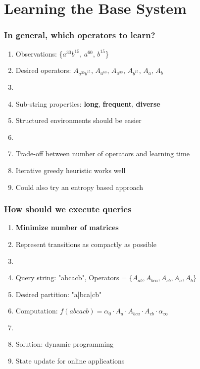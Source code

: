 \documentclass{beamer}
\begin{document}

\section{Learning the Base System}

\begin{frame}
\frametitle{In general, which operators to learn?}
\begin{enumerate}

\item Observations: \{$a^{30}b^{15}$, $a^{60}$, $b^{15}$\}

\item[] Desired operators: $A_{a^{30}b^{15}}$, $A_{a^{60}}$, $A_{a^{30}}$, $A_{b^{15}}$, $A_a$, $A_b$
\item[]

\item Sub-string properties: 
\textbf{long}, \textbf{frequent}, \textbf{diverse}
\item[] Structured environments should be easier
\item[]

\item Trade-off between number of operators and learning time
\item[] Iterative greedy heuristic works well
\item[] Could also try an entropy based approach

\end{enumerate}
\end{frame}


\begin{frame}
\frametitle{How should we execute queries}
\begin{enumerate}

\item \textbf{Minimize number of matrices}
\item[] Represent transitions as compactly as possible 
\item[]

\item Query string: "abcacb", Operators = $\{A_{ab}, A_{bca}, A_{cb}, A_a, A_b \}$ 


\item[] Desired partition: "a|bca|cb"
\item[] Computation: $f(abcacb)=\alpha_0 \cdot A_a \cdot A_{bca} \cdot A_{cb} \cdot \alpha_\infty$ 
\item[]

\item Solution: dynamic programming
\item[] State update for online applications

\end{enumerate}
\end{frame}
\end{document}
